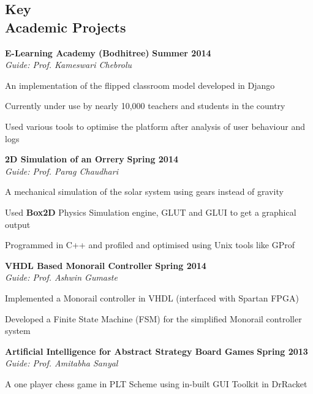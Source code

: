 \documentclass[margin,11pt]{resume}
\begin{document}
\begin{resume}
\vspace{115pt}

\section{\mysidestyle Key \\ Academic Projects}
\textbf{E-Learning Academy (Bodhitree)} \hfill \textbf{Summer 2014}\\
\textsl{Guide: Prof. Kameswari Chebrolu}
\begin{list2}
\item An implementation of the flipped classroom model developed in Django
\item Currently under use by nearly 10,000 teachers and students in the country 
\item Used various tools to optimise the platform after analysis of user behaviour and logs
\end{list2}
\vspace{-2.5mm}
\textbf{2D Simulation of an Orrery} \hfill \textbf{Spring 2014}\\
\textsl{Guide: Prof. Parag Chaudhari}
\begin{list2}
\item A mechanical simulation of the solar system using gears instead of gravity 
\item Used \textbf{Box2D} Physics Simulation engine, GLUT and GLUI to get a graphical output
\item Programmed in C++ and profiled and optimised using Unix tools like GProf
\end{list2}
\vspace{-2.5mm}
\textbf{VHDL Based Monorail Controller} \hfill \textbf{Spring 2014}\\
\textsl{Guide: Prof. Ashwin Gumaste}
\begin{list2}
\item Implemented a Monorail controller in VHDL (interfaced with Spartan FPGA)
\item Developed a Finite State Machine (FSM) for the simplified Monorail controller system
\end{list2}
\vspace{-2.5mm}
\textbf{Artificial Intelligence for Abstract Strategy Board Games} \hfill \textbf{Spring 2013}\\
\textsl{Guide: Prof. Amitabha Sanyal}
\begin{list2}
\item A one player chess game in PLT Scheme using in-built GUI Toolkit in DrRacket 

\end{list2}
\end{resume}
\end{document}
